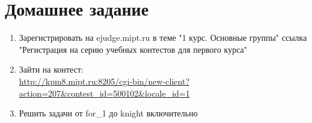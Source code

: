 \documentclass[12pt,pdf,hyperref={unicode}]{beamer}
\begin{document}
\section{Домашнее задание}

\begin{frame}
\begin{enumerate}
\item Зарегистрировать на ejudge.mipt.ru в теме "1 курс. Основные группы" ссылка "Регистрация на серию учебных контестов для первого курса"
\item Зайти на контест:\\
\url{http://kpm8.mipt.ru:8205/cgi-bin/new-client?action=207&contest_id=500102&locale_id=1}
\item Решить задачи от for\_1 до knight включительно
\end{enumerate}
\end{frame}

\fi
\end{document}
